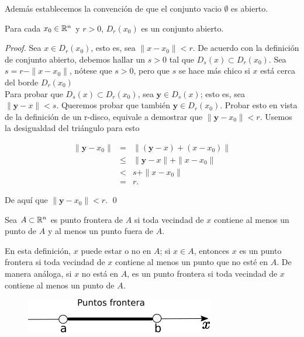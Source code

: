 Además establecemos la convención de que el conjunto vacio $\emptyset$ es abierto.

\begin{theorem}
    Para cada $x_{0} \in \mathbb{R}^{n}$ y $r > 0$, $D_{r}(x_{0})$ es un conjunto abierto.
\end{theorem}

\begin{proof}
    Sea $x \in D_{r}(x_{0})$, esto es, sea $\|x - x_{0}\| < r$. De acuerdo con la definición
    de conjunto abierto, debemos hallar un $s > 0$ tal que $D_{s}(x) \subset  D_{r}(x_{0})$.
    Sea $s = r - \|x - x_{0}\|$, nótese que $s > 0$, pero que $s$ se hace más chico si $x$ está
    cerca del borde $D_{r}(x_{0})$ \\

    Para probar que $D_{s}(x) \subset D_{r}(x_{0})$, sea $\bm{y} \in D_{s}(x)$; esto es, sea
    $\|\bm{y} - x\| < s$. Queremos probar que también $\bm{y} \in D_{r}(x_{0})$. Probar esto en vista
    de la definición de un r-disco, equivale a demostrar que $\|\bm{y} -x_{0}\| < r$. Usemos la desigualdad
    del triángulo para esto

    \begin{eqnarray*}
        \|\bm{y} - x_{0}\| &=& \|(\bm{y} - x) + (x - x_{0})\| \\
                              &\le& \|\bm{y} - x\| + \|x - x_{0}\| \\
                              &<& s + \|x-x_{0}\| \\
                              &=& r \text{.}
    \end{eqnarray*}

    De aquí que $\|\bm{y} - x_{0}\| < r$. \qed

\end{proof}

\begin{definition}
    Sea $A \subset \mathbb{R}^{n}$ es punto frontera de $A$ si toda vecindad de $x$ contiene al menos un punto de $A$ y al menos un punto fuera de $A$.
\end{definition}

En esta definición, $x$ puede estar o no en $A$; si $x \in A$, entonces $x$ es un punto frontera si toda vecindad de $x$ contiene al menos un punto
que no esté en $A$. De manera análoga, si $x$ no está en $A$, es un punto frontera si toda vecindad de
$x$ contiene al menos un punto de $A$.

\begin{figure}[!ht]
  \begin{center}
      \includegraphics[width=0.5\linewidth]{gfx/puntos-frontera}
      \caption{}
      \label{fig:boat1}
  \end{center}
\end{figure}


